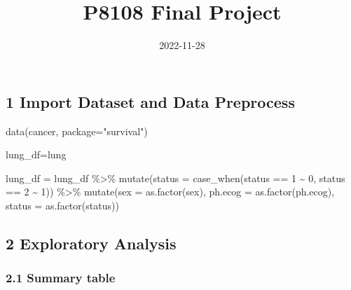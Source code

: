 \documentclass[
]{article}
\title{P8108 Final Project}
\author{}
\date{\vspace{-2.5em}2022-11-28}
\newenvironment{Shaded}{\begin{snugshade}}{\end{snugshade}}
\newcommand{\AttributeTok}[1]{\textcolor[rgb]{0.77,0.63,0.00}{#1}}
\newcommand{\DecValTok}[1]{\textcolor[rgb]{0.00,0.00,0.81}{#1}}
\newcommand{\FunctionTok}[1]{\textcolor[rgb]{0.00,0.00,0.00}{#1}}
\newcommand{\NormalTok}[1]{#1}
\newcommand{\OtherTok}[1]{\textcolor[rgb]{0.56,0.35,0.01}{#1}}
\newcommand{\SpecialCharTok}[1]{\textcolor[rgb]{0.00,0.00,0.00}{#1}}
\newcommand{\StringTok}[1]{\textcolor[rgb]{0.31,0.60,0.02}{#1}}
\begin{document}
\maketitle

\hypertarget{import-dataset-and-data-preprocess}{%
\subsection{1 Import Dataset and Data
Preprocess}\label{import-dataset-and-data-preprocess}}

\begin{Shaded}
\begin{Highlighting}[]
\FunctionTok{data}\NormalTok{(cancer, }\AttributeTok{package=}\StringTok{"survival"}\NormalTok{)}

\NormalTok{lung\_df}\OtherTok{=}\NormalTok{lung}

\NormalTok{lung\_df }\OtherTok{=}\NormalTok{ lung\_df }\SpecialCharTok{\%\textgreater{}\%}
  \FunctionTok{mutate}\NormalTok{(}\AttributeTok{status =} \FunctionTok{case\_when}\NormalTok{(status }\SpecialCharTok{==} \DecValTok{1} \SpecialCharTok{\textasciitilde{}} \DecValTok{0}\NormalTok{,}
\NormalTok{                            status }\SpecialCharTok{==} \DecValTok{2} \SpecialCharTok{\textasciitilde{}} \DecValTok{1}\NormalTok{)) }\SpecialCharTok{\%\textgreater{}\%}
  \FunctionTok{mutate}\NormalTok{(}\AttributeTok{sex =} \FunctionTok{as.factor}\NormalTok{(sex),}
         \AttributeTok{ph.ecog =} \FunctionTok{as.factor}\NormalTok{(ph.ecog), }
         \AttributeTok{status =} \FunctionTok{as.factor}\NormalTok{(status))}
\end{Highlighting}
\end{Shaded}

\hypertarget{exploratory-analysis}{%
\subsection{2 Exploratory Analysis}\label{exploratory-analysis}}

\hypertarget{summary-table}{%
\subsubsection{2.1 Summary table}\label{summary-table}}
\end{document}
